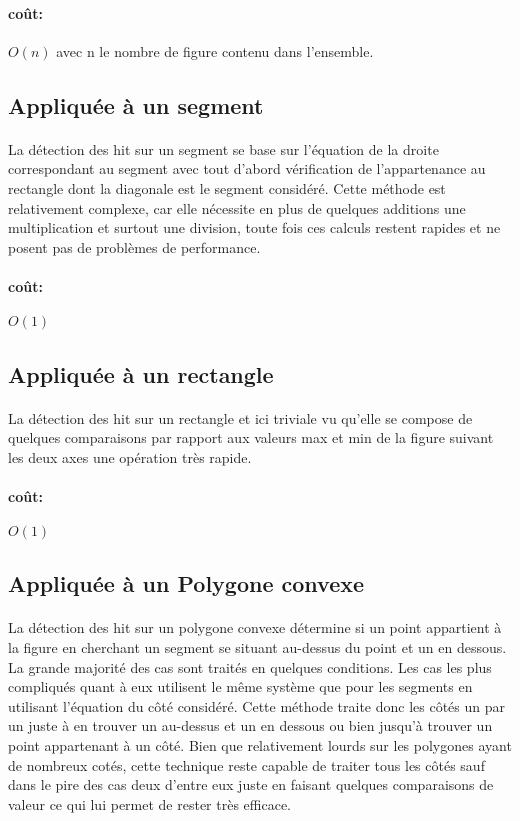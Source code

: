 \documentclass[a4paper, 12pts]{article}
\begin{document}
\paragraph{coût: }
\(O(n)\) avec n le nombre de figure contenu dans l'ensemble.

\subsection{Appliquée à un segment}
\paragraph{}
La détection des hit sur un segment se base sur l’équation de la droite correspondant au segment avec tout d'abord vérification de l’appartenance au rectangle dont la diagonale est le segment considéré. Cette méthode est relativement complexe, car elle nécessite en plus de quelques additions une multiplication et surtout une division, toute fois ces calculs restent rapides et ne posent pas de problèmes de performance.
\paragraph{coût: }
\(O(1)\)

\subsection{Appliquée à un rectangle}
\paragraph{}
La détection des hit sur un rectangle et ici triviale vu qu'elle se compose de quelques comparaisons par rapport aux valeurs max et min de la figure suivant les deux axes une opération très rapide.
\paragraph{coût: }
\(O(1)\)

\subsection{Appliquée à un Polygone convexe}
\paragraph{}
La détection des hit sur un polygone convexe détermine si un point appartient à la figure en cherchant un segment se situant au-dessus du point et un en dessous. La grande majorité des cas sont traités en quelques conditions. Les cas les plus compliqués quant à eux utilisent le même système que pour les segments en utilisant l'équation du côté considéré. Cette méthode traite donc les côtés un par un juste à en trouver un au-dessus et un en dessous ou bien jusqu’à trouver un point appartenant à un côté. Bien que relativement lourds sur les polygones ayant de nombreux cotés, cette technique reste capable de traiter tous les côtés sauf dans le pire des cas deux d'entre eux juste en faisant quelques comparaisons de valeur ce qui lui permet de rester très efficace.
\end{document}
